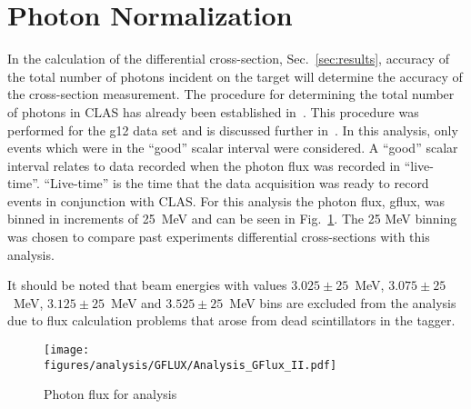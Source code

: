 \section{Photon Normalization}\label{sec:analysis.gflux}
In the calculation of the differential cross-section, Sec.~\ref{sec:results}, accuracy of the total number of photons incident on the target will determine the accuracy of the cross-section measurement. The procedure for determining the total number of photons in CLAS has already been established in~\cite{clas.gflux}. This procedure was performed for the g12 data set and is discussed further in~\cite{clas.g12.note}. In this analysis, only events which were in the ``good'' scalar interval were considered. A ``good'' scalar interval relates to data recorded when the photon flux was recorded in ``live-time''. ``Live-time'' is the time that the data acquisition was ready to record events in conjunction with CLAS. For this analysis the photon flux, gflux, was binned in increments of 25~MeV and can be seen in Fig.~\ref{fig:gflux}. The 25 MeV binning was chosen to compare past experiments differential cross-sections with this analysis.

It should be noted that beam energies with values $3.025 \pm 25$~MeV, $3.075 \pm25$~MeV, $3.125 \pm25$~MeV and $3.525 \pm25$~MeV bins are excluded from the analysis due to flux calculation problems that arose from dead scintillators in the tagger. 

\begin{figure}[h!]\begin{center}
\texttt{[image: \\figures/analysis/GFLUX/Analysis\_GFlux\_II.pdf]}
\caption[Photon flux for analysis]{\label{fig:gflux}Photon flux for analysis}
\end{center}\end{figure}
\FloatBarrier

